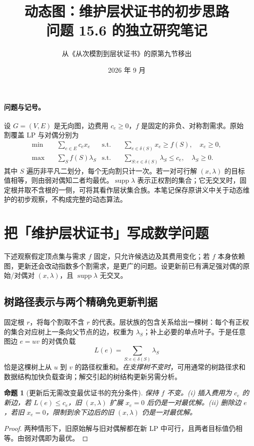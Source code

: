 \documentclass[UTF8,10pt,a4paper]{ctexart}
\title{动态图：维护层状证书的初步思路\\\large 问题 15.6 的独立研究笔记}
\author{从《从次模割到层状证书》的原第九节移出}
\date{2026 年 9 月}
\newtheorem{proposition}{命题}[section]
\newcommand{\cut}{\delta}
\newcommand{\supp}{\operatorname{supp}}
\begin{document}
\maketitle

\paragraph{问题与记号。}设 $G=(V,E)$ 是无向图，边费用 $c_e\ge0$，$f$ 是固定的非负、对称割需求。原始割覆盖 LP 与对偶分别为
\begin{align*}
\min\quad&\sum_{e\in E}c_ex_e
&\text{s.t.}\quad&\sum_{e\in\cut(S)}x_e\ge f(S),\quad x_e\ge0,\\
\max\quad&\sum_S f(S)\lambda_S
&\text{s.t.}\quad&\sum_{S:e\in\cut(S)}\lambda_S\le c_e,\quad \lambda_S\ge0.
\end{align*}
其中 $S$ 遍历非平凡二划分，每个无向割只计一次。若一对可行解 $(x,\lambda)$ 的目标值相等，则由弱对偶知二者均最优。$\supp\lambda$ 表示正权割的集合；它无交叉时，固定根并取不含根的一侧，可将其看作层状集合族。本笔记保存原讲义中关于动态维护的初步观察，不构成完整的动态算法。

\section{把「维护层状证书」写成数学问题}

下述观察假定顶点集与需求 $f$ 固定，只允许候选边及其费用变化；若 $f$ 本身依赖图，更新还会改动指数多个割需求，是更广的问题。设更新前已有满足强对偶的原始/对偶对 $(x,\lambda)$，且 $\supp\lambda$ 无交叉。

\subsection{树路径表示与两个精确免更新判据}

固定根 $r$，将每个割取不含 $r$ 的代表。层状族的包含关系给出一棵树：每个有正权的集合对应树上一条向父节点的边，权重为 $\lambda_S$；补上必要的单点叶子。于是任意图边 $e=uv$ 的对偶负载
\begin{equation}\label{eq:pathload}
L(e)=\sum_{S:e\in\cut(S)}\lambda_S
\end{equation}
恰是这棵树上从 $u$ 到 $v$ 的路径权重和。\emph{在支撑树不变时}，可用通常的树路径求和数据结构加快负载查询；解交引起的树结构更新另需分析。

\begin{proposition}[更新后无需改变最优证书的充分条件]\label{prop:no-op}
保持 $f$ 不变。(i) 插入费用为 $c_e$ 的新边，若 $L(e)\le c_e$，旧 $(x,\lambda)$ 扩展 $x_e=0$ 后仍是一对最优解。(ii) 删除边 $e$，若旧 $x_e=0$，限制到余下边后的旧 $(x,\lambda)$ 仍是一对最优解。
\end{proposition}
\begin{proof}
两种情形下，旧原始解与旧对偶解都在新 LP 中可行，且两者目标值仍相等。由弱对偶即为最优。
\end{proof}
\end{document}
